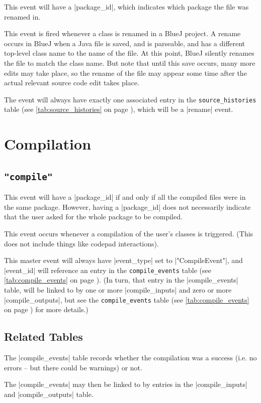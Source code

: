 \documentclass{report}
\newcommand{\myref}[1]{\autoref{#1} on page \pageref*{#1}}
\newcommand{\tabref}[1]{\lstinline|#1| table (see \myref{tab:#1})}
\begin{document}
This event will have a |package_id|, which indicates which package the file
was renamed in.

This event is fired whenever a class is renamed in a BlueJ project.  A rename
occurs in BlueJ when a Java file is saved, and is parseable, and has a
different top-level class name to the name of the file.  At this point, BlueJ
silently renames the file to match the class name.  But note that until this
save occurs, many more edits may take place, so the rename of the file may
appear some time after the actual relevant source code edit takes place.

The event will always have exactly one associated entry in the
\tabref{source_histories}, which will be a |rename| event.

\section{Compilation}

\subsection{\lstinline!"compile"!}

This event will have a |package_id| if and only if all the compiled files were
in the same package.  However, having a |package_id| does not necessarily
indicate that the user asked for the whole package to be compiled.

This event occurs whenever a compilation of the user's classes is triggered.
(This does not include things like codepad interactions).

This master event will always have |event_type| set to |"CompileEvent"|, and
|event_id| will reference an entry in the \tabref{compile_events}.  (In turn,
that entry in the |compile_events| table, will be linked to by one or more
|compile_inputs| and zero or more |compile_outputs|, but see the
\tabref{compile_events} for more details.)

\subsection{Related Tables}

The |compile_events| table records whether the compilation was a success
(i.e. no errors -- but there could be warnings) or not.


The |compile_events| may then be linked to by entries in the |compile_inputs| and
|compile_outputs| table.
\end{document}
